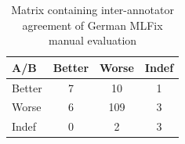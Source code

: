 \begin{table}[t]
\centering
\small

\begin{tabular}{l|cc|c}
 A/B  &  Better  &  Worse  &  Indef  \\
\hline
Better  &  7  &  10  &  1  \\
Worse  &  6  &  109  &  3  \\
\hline
Indef &  0  &  2  &  3  \\
\end{tabular}
\caption{
    Matrix containing inter-annotator agreement of German MLFix manual evaluation
}
\label{maneval_de-agree}
\end{table}
 
